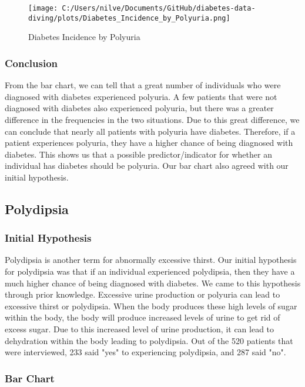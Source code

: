\documentclass[
]{article}
\begin{document}
\begin{figure}
\centering
\texttt{[image: C:/Users/nilve/Documents/GitHub/diabetes-data-diving/plots/Diabetes\_Incidence\_by\_Polyuria.png]}
\caption{Diabetes Incidence by Polyuria}
\end{figure}

\hypertarget{header-n883}{%
\subsubsection{Conclusion}\label{header-n883}}

From the bar chart, we can tell that a great number of individuals who
were diagnosed with diabetes experienced polyuria. A few patients that
were not diagnosed with diabetes also experienced polyuria, but there
was a greater difference in the frequencies in the two situations. Due
to this great difference, we can conclude that nearly all patients with
polyuria have diabetes. Therefore, if a patient experiences polyuria,
they have a higher chance of being diagnosed with diabetes. This shows
us that a possible predictor/indicator for whether an individual has
diabetes should be polyuria. Our bar chart also agreed with our initial
hypothesis.

\hypertarget{header-n885}{%
\subsection{Polydipsia}\label{header-n885}}

\hypertarget{header-n886}{%
\subsubsection{Initial Hypothesis}\label{header-n886}}

Polydipsia is another term for abnormally excessive thirst. Our initial
hypothesis for polydipsia was that if an individual experienced
polydipsia, then they have a much higher chance of being diagnosed with
diabetes. We came to this hypothesis through prior knowledge. Excessive
urine production or polyuria can lead to excessive thirst or polydipsia.
When the body produces these high levels of sugar within the body, the
body will produce increased levels of urine to get rid of excess sugar.
Due to this increased level of urine production, it can lead to
dehydration within the body leading to polydipsia. Out of the 520
patients that were interviewed, 233 said "yes" to experiencing
polydipsia, and 287 said "no".

\hypertarget{header-n888}{%
\subsubsection{Bar Chart}\label{header-n888}}
\end{document}

